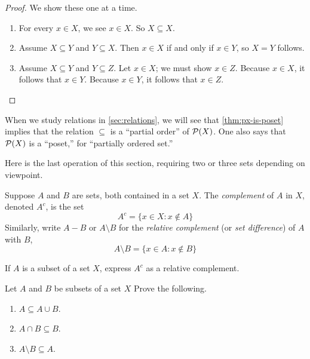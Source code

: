 \documentclass[../main.tex]{subfiles}
\begin{document}
\begin{proof}
    We show these one at a time.
    \begin{enumerate}[label=(\alph*)]
        \item For every $x \in X$, we see $x \in X$. So $X \subseteq X$.
        \item Assume $X \subseteq Y$ and $Y \subseteq X$. Then $x \in X$ if and only if $x \in Y$, so $X=Y$ follows.
        \item Assume $X \subseteq Y$ and $Y \subseteq Z$. Let $x \in X$; we must show $x \in Z$. Because $x \in X$, it follows that $x \in Y$. Because $x \in Y$, it follows that $x \in Z$.
        \qedhere
    \end{enumerate}
\end{proof}
\begin{remark}
    When we study relations in \cref{sec:relations}, we will see that \autoref{thm:px-is-poset} implies that the relation $\subseteq$ is a ``partial order'' of $\mathcal{P}(X)$. One also says that $\mathcal{P}(X)$ is a ``poset,'' for ``partially ordered set.''
\end{remark}
Here is the last operation of this section, requiring two or three sets depending on viewpoint.
\begin{definition}[complement]
    Suppose $A$ and $B$ are sets, both contained in a set $X$. The \emph{complement} of $A$ in $X$, denoted $A^c$, is the set
    $$A^c = \{x \in X: x \notin A\}$$
    Similarly, write $A - B$ or $A \setminus B$ for the \emph{relative complement} (or \emph{set difference}) of $A$ with $B$,
    $$A \setminus B = \{x \in A : x \notin B\}$$
\end{definition}
\begin{exercise}
    If $A$ is a subset of a set $X$, express $A^c$ as a relative complement.
\end{exercise}
\begin{exercise}
    Let $A$ and $B$ be subsets of a set $X$ Prove the following.
    \begin{enumerate}[label=(\alph*)]
        \item $A \subseteq A \cup B$.
        \item $A \cap B \subseteq B$.
        \item $A \setminus B \subseteq A$.
    \end{enumerate}
\end{exercise}
\end{document}
